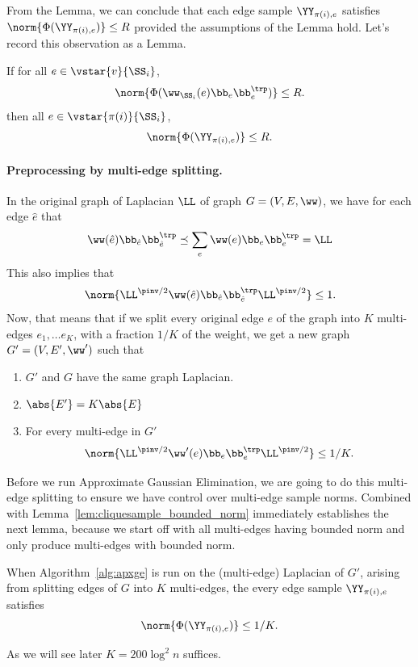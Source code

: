 From the Lemma, we can conclude that each edge sample $\YY_{\pi(i),e}$
satisfies
$\norm{\Phi(\YY_{\pi(i),e})} \leq R$
provided the assumptions of the
Lemma hold. Let's record this observation as a Lemma.
\begin{lemma}
  If for all $e \in \vstar{v}{\SS_i}$,
  \[
    \norm{\Phi(\ww_{\SS_i }(e)\bb_{e} \bb_{e}^{\trp})}
    \leq
    R
    .
  \]
  then all $e \in \vstar{\pi(i)}{\SS_i}$,
  \[
    \norm{\Phi(\YY_{\pi(i),e})} \leq R
 .
  \]
\end{lemma}

\paragraph{Preprocessing by multi-edge splitting.}
In the original graph of Laplacian $\LL$ of graph $G = (V,E,\ww)$, we
have for each edge $\hat{e}$ that
\[
  \ww(\hat{e}) \bb_{\hat{e}}\bb_{\hat{e}}^{\trp} \preceq \sum_e \ww(e) \bb_{e}\bb_{e}^{\trp}= \LL
\]
This also implies that
\[
  \norm{\LL^{\pinv/2}  \ww(\hat{e})  \bb_{\hat{e}}\bb_{\hat{e}}^{\trp} \LL^{\pinv/2} }\leq 1.
\]
Now, that means that if we split every original edge $e$ of the graph
into $K$ multi-edges $e_1, \ldots e_K$, with a fraction $1/K$ of the
weight, we get a new graph $G' = (V, E', \ww')$ such that
\begin{claim}
  \label{clm:edgesplit}
  \noindent
  \begin{enumerate}
  \item $G'$ and $G$ have the same graph Laplacian.
  \item $\abs{E'} = K\abs{E}$
  \item For every multi-edge in $G'$
    \[
      \norm{\LL^{\pinv/2} \ww'(e) \bb_{e}\bb_{e}^{\trp} \LL^{\pinv/2}
      }\leq 1/K.
    \]
  \end{enumerate}
\end{claim}
Before we run Approximate Gaussian Elimination, we are going to do
this multi-edge splitting to ensure we have control over multi-edge
sample norms.
%
Combined with Lemma~\ref{lem:cliquesample_bounded_norm} immediately
establishes the next lemma, because we start off with all multi-edges
having bounded norm and only produce multi-edges with bounded norm.
\begin{lemma}
  \label{lem:edgesampnorm}
  When Algorithm~\ref{alg:apxge} is run on the (multi-edge) Laplacian of $G'$,
  arising from splitting edges of $G$ into $K$ multi-edges, the every
  edge sample $\YY_{\pi(i),e}$ satisfies
  \[
    \norm{\Phi(\YY_{\pi(i),e})} \leq 1/K
 .
  \]
\end{lemma}
As we will see later $K = 200 \log^2 n$ suffices.

